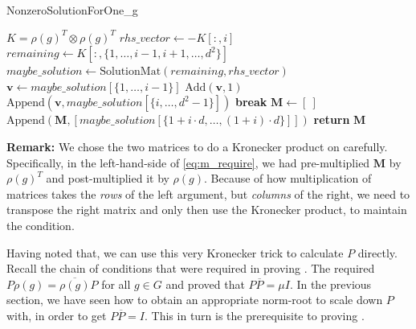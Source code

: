 \documentclass[11pt]{article}
\begin{document}
\begin{algorithm}
  \caption{NonzeroSolutionForOne\_g}
  \label{alg:nonzero}
  \begin{algorithmic}
    \State $K = \rho(g)^T \otimes \rho(g)^T$ 
      \State $rhs\_vector \gets -K[:,i]$ 
      \State $remaining \gets K[:,\{1, \ldots, i-1, i+1, \ldots, d^2\}]$ 
      \State $maybe\_solution \gets \text{SolutionMat}(remaining, rhs\_vector)$
      \State {}
      \break
       
        \State $\mathbf{v} \gets maybe\_solution[\{1, \ldots, i-1\}]$
        \State $\text{Add}(\mathbf{v}, 1)$ 
        \State $\text{Append}(\mathbf{v},maybe\_solution[\{i, \ldots, d^2-1\}])$ 
        \State \textbf{break}
      \EndIf
    \EndFor
    \State $\mathbf{M} \gets [~]$ 
      \State $\text{Append}(\mathbf{M}, [maybe\_solution[\{1+i\cdot d, \ldots, (1+i)\cdot d\}]])$
    \EndFor
    \State \textbf{return} $\mathbf{M}$
  \end{algorithmic}
\end{algorithm}

\textbf{Remark:} We chose the two matrices to do a Kronecker product on carefully. Specifically,
in the left-hand-side of \cref{eq:m_require}, we had pre-multiplied $\mathbf{M}$ by $\rho(g)^T$
and post-multiplied it by $\rho(g)$. Because of how multiplication of matrices takes the \textit{rows}
of the left argument, but \textit{columns} of the right, we need to transpose the right matrix
and only then use the Kronecker product, to maintain the condition.

Having noted that, we can use this very Kronecker trick to calculate $P$ directly. Recall the chain
of conditions that were required in proving \cite[Lemma 3.2, 3.3]{Pas21}. The \cite[Lemma 3.2]{Pas21}
required $P\rho(g) = \overline{\rho(g)}P$ for all $g\in G$ and proved that
$P\overline{P} = \mu I$. In the previous section, we have seen how to obtain an
appropriate norm-root to scale down $P$ with, in order to get $P\overline{P} = I$.
This in turn is the prerequisite to proving \cite[Lemma 3.3]{Pas21}.
\end{document}
